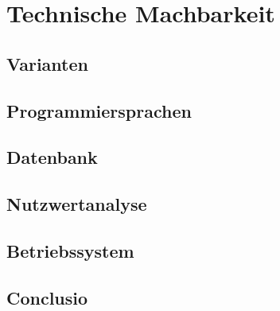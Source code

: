 \chapter{Technische Machbarkeit}



\section{Varianten}

\section{Programmiersprachen}

\section{Datenbank}

\section{Nutzwertanalyse}

\section{Betriebssystem}

\section{Conclusio}

